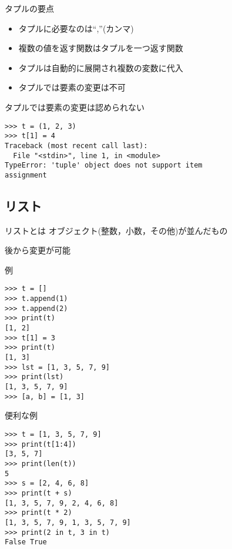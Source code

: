 \documentclass[12pt, xetex, xcolor=pdftex, dvipsnames]{beamer}
\begin{document}
\begin{frame}{タプルの要点}
    \begin{itemize}
        \item タプルに必要なのは``,''(カンマ)
        \item 複数の値を返す関数はタプルを一つ返す関数
        \item タプルは自動的に展開され複数の変数に代入
        \item \alert{タプルでは要素の変更は不可}
    \end{itemize}
\end{frame}
\begin{frame}[fragile]
    \alert{タプルでは要素の変更は認められない}
\begin{lstlisting}
>>> t = (1, 2, 3)
>>> t[1] = 4
Traceback (most recent call last):
  File "<stdin>", line 1, in <module>
TypeError: 'tuple' object does not support item
assignment
\end{lstlisting}
\end{frame}

\subsection{リスト}
\begin{frame}{リストとは}
    オブジェクト(整数，小数，その他)が並んだもの

    後から変更が可能
\end{frame}
\begin{frame}[fragile]{例}
    \begin{lstlisting}
>>> t = []
>>> t.append(1)
>>> t.append(2)
>>> print(t)
[1, 2]
>>> t[1] = 3
>>> print(t)
[1, 3]
>>> lst = [1, 3, 5, 7, 9]
>>> print(lst)
[1, 3, 5, 7, 9]
>>> [a, b] = [1, 3]
    \end{lstlisting}
\end{frame}
\begin{frame}[fragile]{便利な例}
    \begin{lstlisting}
>>> t = [1, 3, 5, 7, 9]
>>> print(t[1:4])
[3, 5, 7]
>>> print(len(t))
5
>>> s = [2, 4, 6, 8]
>>> print(t + s)
[1, 3, 5, 7, 9, 2, 4, 6, 8]
>>> print(t * 2)
[1, 3, 5, 7, 9, 1, 3, 5, 7, 9]
>>> print(2 in t, 3 in t)
False True
    \end{lstlisting}
\end{frame}
\end{document}
